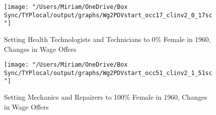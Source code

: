 \documentclass[12pt]{article}
\begin{document}

\begin{figure}[H]
\centering
\caption{Setting Health Technologists and Technicians to 0\% Female in 1960, Changes in Wage Offers}
\label{nurses}
\texttt{[image: "/Users/Miriam/OneDrive/Box Sync/TYPlocal/output/graphs/Wg2PDVstart\_occ17\_clinv2\_0\_17sc"]}
\end{figure}


\begin{figure}[H]
\centering
\caption{Setting Mechanics and Repairers to 100\% Female in 1960, Changes in Wage Offers}
\label{mechanics}
\texttt{[image: "/Users/Miriam/OneDrive/Box Sync/TYPlocal/output/graphs/Wg2PDVstart\_occ51\_clinv2\_1\_51sc"]}
\end{figure}
\end{document}
